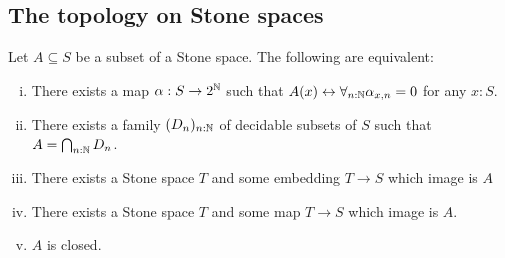 \subsection{The topology on Stone spaces}
\begin{theorem}\label{StoneClosedSubsets}
  Let $A\subseteq S$ be a subset of a Stone space. The following are equivalent:
  \begin{enumerate}[(i)]
    \item There exists a map $\alpha:S \to 2^{\mathbb{N}}$ such that 
      $A (x) \leftrightarrow \forall_{n:\mathbb{N}} \alpha_{x,n} = 0$ for any $x:S$. 
    \item There exists a family 
      $(D_n)_{n:\mathbb{N}}$ 
      of decidable subsets of $S$ such that $A = \bigcap_{n:\mathbb{N}} D_n$. 
    \item There exists a Stone space $T$ and some embedding $T\to S$ which image is $A$
    \item There exists a Stone space $T$ and some map $T\to S$ which image is $A$. 
    \item $A$ is closed.
  \end{enumerate}
\end{theorem}
